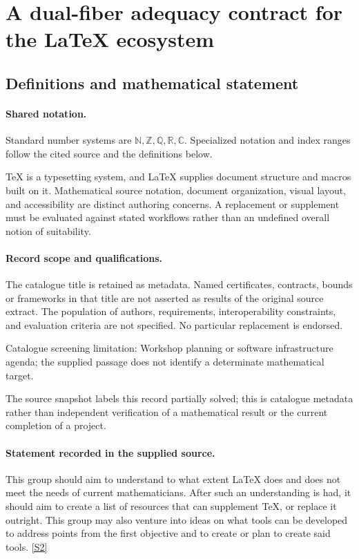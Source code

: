 \documentclass[11pt]{article}
\newcommand{\sref}[2]{\hyperlink{source:#1:#2}{[S#2]}}
\begin{document}
\section{A dual-fiber adequacy contract for the LaTeX ecosystem}\label{statement}

\subsection{Definitions and mathematical statement}

\paragraph{Shared notation.}Standard number systems are $\mathbb N,\mathbb Z,\mathbb Q,\mathbb R,\mathbb C$. Specialized notation and index ranges follow the cited source and the definitions below.


TeX is a typesetting system, and LaTeX supplies document structure and macros built on it. Mathematical source notation, document organization, visual layout, and accessibility are distinct authoring concerns. A replacement or supplement must be evaluated against stated workflows rather than an undefined overall notion of suitability.
\paragraph{Record scope and qualifications.}
The catalogue title is retained as metadata. Named certificates, contracts, bounds or frameworks in that title are not asserted as results of the original source extract.
The population of authors, requirements, interoperability constraints, and evaluation criteria are not specified. No particular replacement is endorsed.

Catalogue screening limitation: Workshop planning or software infrastructure agenda; the supplied passage does not identify a determinate mathematical target.

The source snapshot labels this record partially solved; this is catalogue metadata rather than independent verification of a mathematical result or the current completion of a project.
\paragraph{Statement recorded in the supplied source.}
This group should aim to understand to what extent LaTeX does and does not meet the needs of current mathematicians. After such an understanding is had, it should aim to create a list of resources that can supplement TeX, or replace it outright. This group may also venture into ideas on what tools can be developed to address points from the first objective and to create or plan to create said tools. \sref{statement}{2}
\end{document}
